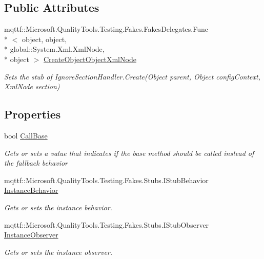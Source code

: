 \subsection*{Public Attributes}
\begin{DoxyCompactItemize}
\item 
mqttf\-::\-Microsoft.\-Quality\-Tools.\-Testing.\-Fakes.\-Fakes\-Delegates.\-Func\\*
$<$ object, object, \\*
global\-::\-System.\-Xml.\-Xml\-Node, \\*
object $>$ \hyperlink{class_system_1_1_configuration_1_1_fakes_1_1_stub_ignore_section_handler_af25c1d37555dcd10b7d71b8c3177b1cc}{Create\-Object\-Object\-Xml\-Node}
\begin{DoxyCompactList}\small\item\em Sets the stub of Ignore\-Section\-Handler.\-Create(\-Object parent, Object config\-Context, Xml\-Node section)\end{DoxyCompactList}\end{DoxyCompactItemize}
\subsection*{Properties}
\begin{DoxyCompactItemize}
\item 
bool \hyperlink{class_system_1_1_configuration_1_1_fakes_1_1_stub_ignore_section_handler_a44e35496457f430a82293e098f3216ee}{Call\-Base}
\begin{DoxyCompactList}\small\item\em Gets or sets a value that indicates if the base method should be called instead of the fallback behavior\end{DoxyCompactList}\item 
mqttf\-::\-Microsoft.\-Quality\-Tools.\-Testing.\-Fakes.\-Stubs.\-I\-Stub\-Behavior \hyperlink{class_system_1_1_configuration_1_1_fakes_1_1_stub_ignore_section_handler_aa6deff926d29aa4f354226ee9ebd20f3}{Instance\-Behavior}
\begin{DoxyCompactList}\small\item\em Gets or sets the instance behavior.\end{DoxyCompactList}\item 
mqttf\-::\-Microsoft.\-Quality\-Tools.\-Testing.\-Fakes.\-Stubs.\-I\-Stub\-Observer \hyperlink{class_system_1_1_configuration_1_1_fakes_1_1_stub_ignore_section_handler_ac856eb0c233877851b2a7a8d5141cf88}{Instance\-Observer}
\begin{DoxyCompactList}\small\item\em Gets or sets the instance observer.\end{DoxyCompactList}\end{DoxyCompactItemize}


